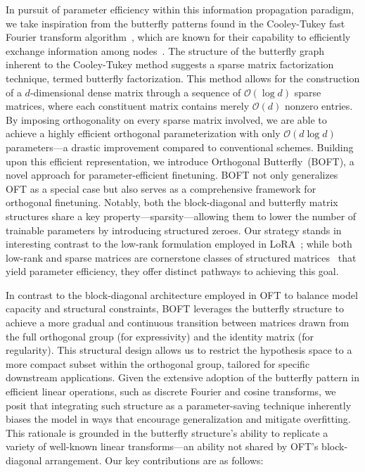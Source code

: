 In pursuit of parameter efficiency within this information propagation paradigm, we take inspiration from the butterfly patterns found in the Cooley-Tukey fast Fourier transform algorithm~\cite{cooley1965algorithm}, which are known for their capability to efficiently exchange information among nodes~\cite{klasing1994broadcasting}. The structure of the butterfly graph inherent to the Cooley-Tukey method suggests a sparse matrix factorization technique, termed butterfly factorization. This method allows for the construction of a $d$-dimensional dense matrix through a sequence of $\mathcal{O}(\log d)$ sparse matrices, where each constituent matrix contains merely $\mathcal{O}(d)$ nonzero entries. By imposing orthogonality on every sparse matrix involved, we are able to achieve a highly efficient orthogonal parameterization with only $\mathcal{O}(d\log d)$ parameters—a drastic improvement compared to conventional schemes. Building upon this efficient representation, we introduce Orthogonal Butterfly~(BOFT), a novel approach for parameter-efficient finetuning. BOFT not only generalizes OFT as a special case but also serves as a comprehensive framework for orthogonal finetuning. Notably, both the block-diagonal and butterfly matrix structures share a key property—sparsity—allowing them to lower the number of trainable parameters by introducing structured zeroes. Our strategy stands in interesting contrast to the low-rank formulation employed in LoRA~\cite{hulora2022}; while both low-rank and sparse matrices are cornerstone classes of structured matrices~\cite{candes2011robust} that yield parameter efficiency, they offer distinct pathways to achieving this goal.

In contrast to the block-diagonal architecture employed in OFT to balance model capacity and structural constraints, BOFT leverages the butterfly structure to achieve a more gradual and continuous transition between matrices drawn from the full orthogonal group (for expressivity) and the identity matrix (for regularity). This structural design allows us to restrict the hypothesis space to a more compact subset within the orthogonal group, tailored for specific downstream applications. Given the extensive adoption of the butterfly pattern in efficient linear operations, such as discrete Fourier and cosine transforms, we posit that integrating such structure as a parameter-saving technique inherently biases the model in ways that encourage generalization and mitigate overfitting. This rationale is grounded in the butterfly structure’s ability to replicate a variety of well-known linear transforms—an ability not shared by OFT’s block-diagonal arrangement. Our key contributions are as follows:

